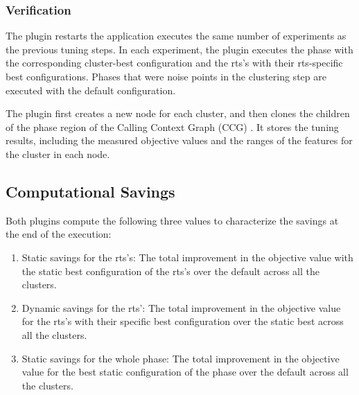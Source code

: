 \subsubsection{Verification} \label{verification} 
The plugin restarts the application executes the same number of experiments as the previous tuning steps. In each experiment, the plugin executes the phase with the
corresponding cluster-best configuration and the rts's with their rts-specific
best configurations. Phases that were noise points in the clustering step are executed with the default configuration.

The plugin first creates a new node for each cluster, and then clones the children of the phase region of the Calling Context Graph (CCG) . It stores the tuning results, including the measured objective values and the ranges of the features for the cluster in each node. 

\subsection{Computational Savings} \label{sec:com-savings}
Both plugins compute the following three values to characterize the savings at the end of the execution:
\begin{enumerate}
	\item Static savings for the rts's: The total improvement in the objective value with the static best configuration of the rts’s over the default across all the clusters.
	\item Dynamic savings for the rts’: The total improvement in the objective value for the rts’s with their specific best configuration over the static best across all the clusters.
	\item Static savings for the whole phase: The total improvement in the objective value for the best static configuration of the phase over the default across all the clusters.
\end{enumerate}


